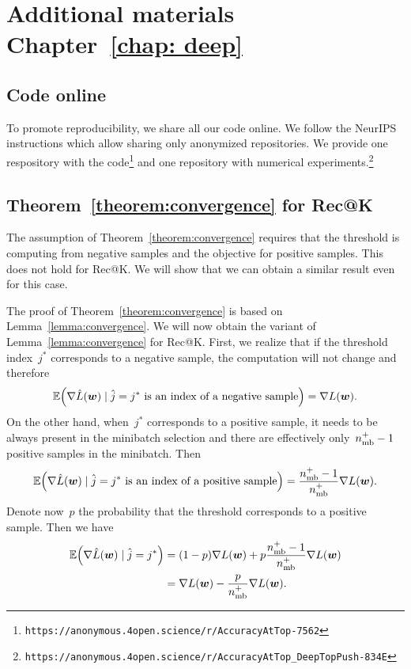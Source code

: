 \chapter{Additional materials Chapter~\ref{chap: deep}}

\section{Code online}

To promote reproducibility, we share all our code online. We follow the NeurIPS instructions which allow sharing only anonymized repositories. We provide one respository with the code\footnote{\texttt{https://anonymous.4open.science/r/AccuracyAtTop-7562}} and one repository with numerical experiments.\footnote{\texttt{https://anonymous.4open.science/r/AccuracyAtTop\_DeepTopPush-834E}}

\section{Theorem~\ref{theorem:convergence} for Rec@K}

The assumption of Theorem~\ref{theorem:convergence} requires that the threshold is computing from negative samples and the objective for positive samples. This does not hold for Rec@K. We will show that we can obtain a similar result even for this case.

The proof of Theorem~\ref{theorem:convergence} is based on Lemma~\ref{lemma:convergence}. We will now obtain the variant of Lemma~\ref{lemma:convergence} for Rec@K. First, we realize that if the threshold index~$j^*$ corresponds to a negative sample, the computation will not change and therefore
\begin{equation*}
  \EE\Brac{\nabla \hat L(\bm w) \mid \hat j=j^*\text{ is an index of a negative sample}}
  =  \nabla L(\bm w).
\end{equation*}
On the other hand, when~$j^*$ corresponds to a positive sample, it needs to be always present in the minibatch selection and there are effectively only~$n_{\rm mb}^+-1$ positive samples in the minibatch. Then
\begin{equation*}
  \EE\Brac{\nabla \hat L(\bm w) \mid \hat j=j^*\text{ is an index of a positive sample}}
  = \frac{\nmin^+-1}{\nmin^+}\nabla L(\bm w).
\end{equation*}
Denote now~$p$ the probability that the threshold corresponds to a positive sample. Then we have
\begin{equation*}
  \begin{aligned}
    \EE\Brac{\nabla \hat L(\bm w) \mid \hat j=j^*}
    & = (1-p)\nabla L(\bm w) + p\frac{\nmin^+-1}{\nmin^+}\nabla L(\bm w) \\
    & = \nabla L(\bm w) - \frac{p}{\nmin^+}\nabla L(\bm w).
\end{aligned}
\end{equation*}

